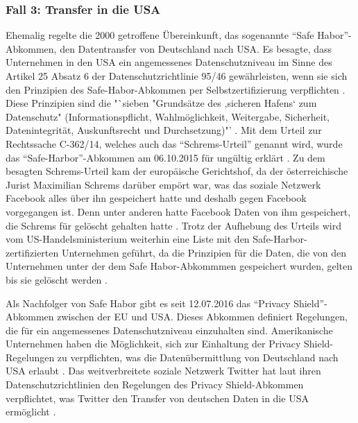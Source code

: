\subsubsection{Fall 3: Transfer in die USA}
Ehemalig regelte die 2000 getroffene Übereinkunft, das sogenannte "`Safe Habor"'-Abkommen, den Datentransfer von Deutschland nach USA. Es besagte, dass Unternehmen in den USA ein angemessenes Datenschutzniveau im Sinne des Artikel 25 Absatz 6 der Datenschutzrichtlinie 95/46 gewährleisten, wenn sie sich den Prinzipien des Safe-Habor-Abkommen per Selbstzertifizierung verpflichten \autocite[vgl.][]{BDFI.2017}. Diese Prinzipien sind die "`sieben "Grundsätze des ,sicheren Hafens‘ zum Datenschutz"  (Informationspflicht, Wahlmöglichkeit, Weitergabe, Sicherheit, Datenintegrität, Auskunftsrecht und Durchsetzung)"' \autocite[][]{BDFI.2017}. Mit dem Urteil zur Rechtssache C-362/14, welches auch das "`Schrems-Urteil"' genannt wird, wurde das "`Safe-Harbor"'-Abkommen am 06.10.2015 für ungültig erklärt \autocite[vgl.][]{BDFI.2017}. Zu dem besagten Schrems-Urteil kam der europäische Gerichtshof, da der österreichische Jurist Maximilian Schrems darüber empört war, was das soziale Netzwerk Facebook alles über ihn gespeichert hatte und deshalb gegen Facebook vorgegangen ist. Denn unter anderen hatte Facebook Daten von ihm gespeichert, die Schrems für gelöscht gehalten hatte \autocite[vgl.][]{Welt.2015}. Trotz der Aufhebung des Urteils wird vom US-Handelsministerium weiterhin eine Liste mit den Safe-Harbor-zertifizierten Unternehmen geführt, da die Prinzipien für die Daten, die von den Unternehmen unter der dem Safe Habor-Abkommmen gespeichert wurden, gelten bis sie gelöscht werden \autocite[vgl.][]{BDFI.2017}.
\par
Als Nachfolger von Safe Habor gibt es seit 12.07.2016 das "`Privacy Shield"'-Abkommen zwischen der \ac{EU} und USA. Dieses Abkommen definiert Regelungen, die für ein angemessenes Datenschutzniveau einzuhalten sind. Amerikanische Unternehmen haben die Möglichkeit, sich zur Einhaltung der Privacy Shield-Regelungen zu verpflichten, was die Datenübermittlung von Deutschland nach USA erlaubt \autocite[vgl.][]{LDI.2017}. Das weitverbreitete soziale Netzwerk Twitter hat laut ihren Datenschutzrichtlinien den Regelungen des Privacy Shield-Abkommen verpflichtet, was Twitter den Transfer von deutschen Daten in die USA ermöglicht \autocite[vgl.][]{TwitterInc..2017}.

